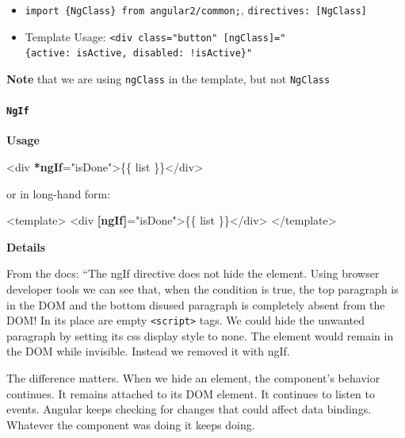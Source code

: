 \documentclass[12pt,]{article}
\newenvironment{Shaded}{}{}
\newcommand{\KeywordTok}[1]{\textcolor[rgb]{0.00,0.00,1.00}{{#1}}}
\newcommand{\StringTok}[1]{\textcolor[rgb]{0.00,0.50,0.50}{{#1}}}
\newcommand{\OtherTok}[1]{\textcolor[rgb]{1.00,0.25,0.00}{{#1}}}
\newcommand{\ErrorTok}[1]{\textcolor[rgb]{1.00,0.00,0.00}{\textbf{{#1}}}}
\newcommand{\NormalTok}[1]{{#1}}
\providecommand{\tightlist}{%
  \setlength{\itemsep}{0pt}\setlength{\parskip}{0pt}}
\let\oldparagraph\paragraph
\renewcommand{\paragraph}[1]{\oldparagraph{#1}\mbox{}}
\begin{document}
\begin{itemize}
\tightlist
\item
  \texttt{import\ \{NgClass\}\ from\ \textquotesingle{}angular2/common\textquotesingle{};},
  \texttt{directives:\ {[}NgClass{]}}
\item
  Template Usage:
  \texttt{\textless{}div\ class="button"\ {[}ngClass{]}="\{active:\ isActive,\ disabled:\ !isActive\}"}
\end{itemize}

\textbf{Note} that we are using \texttt{ngClass} in the template, but
not \texttt{NgClass}

\paragraph{\texorpdfstring{\texttt{NgIf}}{NgIf}}\label{ngif}

\textbf{Usage}

\begin{Shaded}
\begin{Highlighting}[numbers=left,,]
\KeywordTok{<div} \ErrorTok{*ngIf}\OtherTok{=}\StringTok{"isDone"}\KeywordTok{>}\NormalTok{\{\{ list \}\}}\KeywordTok{</div>}
\end{Highlighting}
\end{Shaded}

or in long-hand form:

\begin{Shaded}
\begin{Highlighting}[numbers=left,,]
\KeywordTok{<template>}
  \KeywordTok{<div} \ErrorTok{[ngIf]}\OtherTok{=}\StringTok{"isDone"}\KeywordTok{>}\NormalTok{\{\{ list \}\}}\KeywordTok{</div>}
\KeywordTok{</template>}
\end{Highlighting}
\end{Shaded}

\textbf{Details}

From the docs: ``The ngIf directive does not hide the element. Using
browser developer tools we can see that, when the condition is true, the
top paragraph is in the DOM and the bottom disused paragraph is
completely absent from the DOM! In its place are empty
\texttt{\textless{}script\textgreater{}} tags. We could hide the
unwanted paragraph by setting its css display style to none. The element
would remain in the DOM while invisible. Instead we removed it with
ngIf.

The difference matters. When we hide an element, the component's
behavior continues. It remains attached to its DOM element. It continues
to listen to events. Angular keeps checking for changes that could
affect data bindings. Whatever the component was doing it keeps doing.
\end{document}
